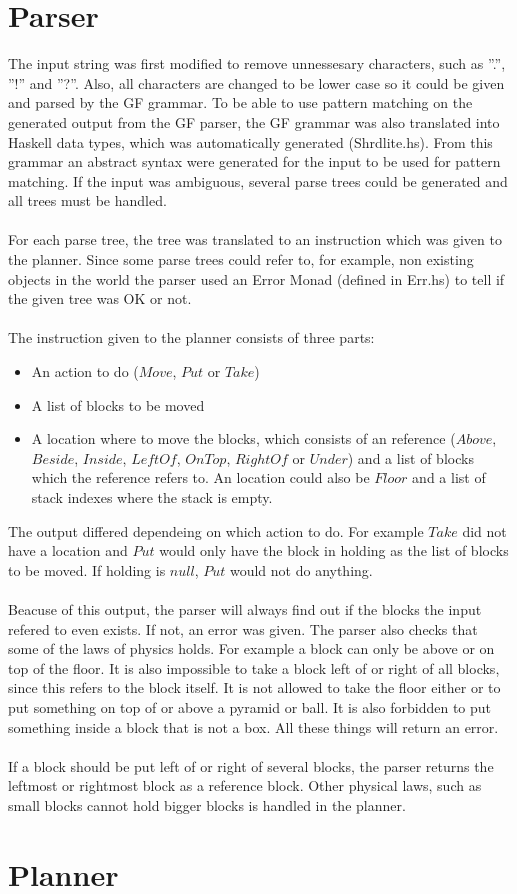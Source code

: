 \section{Parser}
The input string was first modified to remove unnessesary characters, such as ''.'', ''!'' and ''?''. Also, all characters are changed to be lower case so it could be given and parsed by the GF grammar. To be able to use pattern matching on the generated output from the GF parser, the GF grammar was also translated into Haskell data types, which was automatically generated (Shrdlite.hs). From this grammar an abstract syntax were generated for the input to be used for pattern matching. If the input was ambiguous, several parse trees could be generated and all trees must be handled. \\\\
For each parse tree, the tree was translated to an instruction which was given to the planner. Since some parse trees could refer to, for example, non existing objects in the world the parser used an Error Monad (defined in Err.hs) to tell if the given tree was OK or not. \\\\
The instruction given to the planner consists of three parts:
\begin{itemize}
\item An action to do ($Move$, $Put$ or $Take$)
\item A list of blocks to be moved
\item A location where to move the blocks, which consists of an reference ($Above$, $Beside$, $Inside$, $LeftOf$, $OnTop$, $RightOf$ or $Under$) and a list of blocks which the reference refers to. An location could also be $Floor$ and a list of stack indexes where the stack is empty.
\end{itemize}
The output differed dependeing on which action to do. For example $Take$ did not have a location and $Put$ would only have the block in holding as the list of blocks to be moved. If holding is $null$, $Put$ would not do anything.\\\\
Beacuse of this output, the parser will always find out if the blocks the input refered to even exists. If not, an error was given. The parser also checks that some of the laws of physics holds. For example a block can only be above or on top of the floor. It is also impossible to take a block left of or right of all blocks, since this refers to the block itself. It is not allowed to take the floor either or to put something on top of or above a pyramid or ball. It is also forbidden to put something inside a block that is not a box. All these things will return an error. \\\\
If a block should be put left of or right of several blocks, the parser returns the leftmost or rightmost block as a reference block. Other physical laws, such as small blocks cannot hold bigger blocks is handled in the planner.

\section{Planner}


